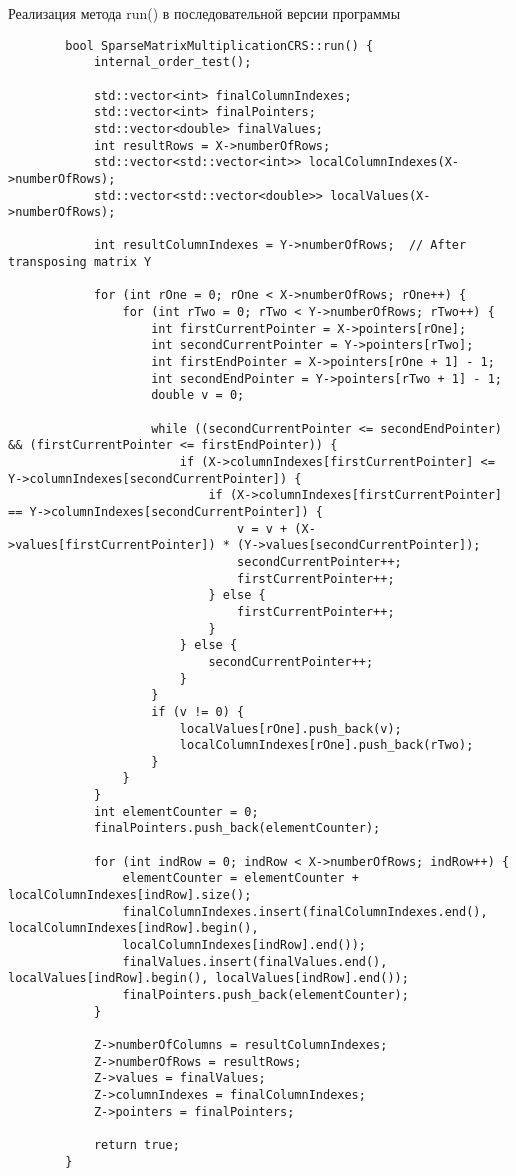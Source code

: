 \documentclass[a4paper, 14pt]{article}
\begin{document}
	Реализация метода run() в последовательной версии программы
	\begin{verbatim}
		bool SparseMatrixMultiplicationCRS::run() {
			internal_order_test();
			
			std::vector<int> finalColumnIndexes;
			std::vector<int> finalPointers;
			std::vector<double> finalValues;
			int resultRows = X->numberOfRows;
			std::vector<std::vector<int>> localColumnIndexes(X->numberOfRows);
			std::vector<std::vector<double>> localValues(X->numberOfRows);
			
			int resultColumnIndexes = Y->numberOfRows;  // After transposing matrix Y
			
			for (int rOne = 0; rOne < X->numberOfRows; rOne++) {
				for (int rTwo = 0; rTwo < Y->numberOfRows; rTwo++) {
					int firstCurrentPointer = X->pointers[rOne];
					int secondCurrentPointer = Y->pointers[rTwo];
					int firstEndPointer = X->pointers[rOne + 1] - 1;
					int secondEndPointer = Y->pointers[rTwo + 1] - 1;
					double v = 0;
					
					while ((secondCurrentPointer <= secondEndPointer) && (firstCurrentPointer <= firstEndPointer)) {
						if (X->columnIndexes[firstCurrentPointer] <= Y->columnIndexes[secondCurrentPointer]) {
							if (X->columnIndexes[firstCurrentPointer] == Y->columnIndexes[secondCurrentPointer]) {
								v = v + (X->values[firstCurrentPointer]) * (Y->values[secondCurrentPointer]);
								secondCurrentPointer++;
								firstCurrentPointer++;
							} else {
								firstCurrentPointer++;
							}
						} else {
							secondCurrentPointer++;
						}
					}
					if (v != 0) {
						localValues[rOne].push_back(v);
						localColumnIndexes[rOne].push_back(rTwo);
					}
				}
			}
			int elementCounter = 0;
			finalPointers.push_back(elementCounter);
			
			for (int indRow = 0; indRow < X->numberOfRows; indRow++) {
				elementCounter = elementCounter + localColumnIndexes[indRow].size();
				finalColumnIndexes.insert(finalColumnIndexes.end(), localColumnIndexes[indRow].begin(),
				localColumnIndexes[indRow].end());
				finalValues.insert(finalValues.end(), localValues[indRow].begin(), localValues[indRow].end());
				finalPointers.push_back(elementCounter);
			}
			
			Z->numberOfColumns = resultColumnIndexes;
			Z->numberOfRows = resultRows;
			Z->values = finalValues;
			Z->columnIndexes = finalColumnIndexes;
			Z->pointers = finalPointers;
			
			return true;
		}
	\end{verbatim}
	
\end{document}
